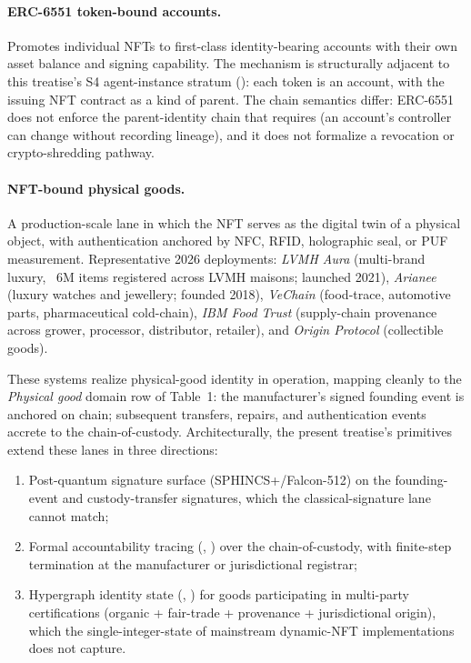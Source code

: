 \documentclass[11pt,a4paper,parskip=half-,DIV=12,headings=standardclasses]{scrartcl}
\theoremstyle{ncthm}
\theoremstyle{ncdef}
\begin{document}
\paragraph{ERC-6551 token-bound accounts.} \cite{erc-6551} Promotes
individual NFTs to first-class identity-bearing accounts with their
own asset balance and signing capability. The mechanism is
structurally adjacent to this treatise's S4 agent-instance stratum
(): each token is an account, with the
issuing NFT contract as a kind of parent. The chain semantics differ:
ERC-6551 does not enforce the parent-identity chain that
 requires (an account's controller
can change without recording lineage), and it does not formalize a
revocation or crypto-shredding pathway.

\paragraph{NFT-bound physical goods.} A production-scale lane in which
the NFT serves as the digital twin of a physical object, with
authentication anchored by NFC, RFID, holographic seal, or PUF
measurement. Representative 2026 deployments:
\emph{LVMH Aura} (multi-brand luxury, ~6M items registered across LVMH
maisons; launched 2021),
\emph{Arianee} (luxury watches and jewellery; founded 2018),
\emph{VeChain} (food-trace, automotive parts, pharmaceutical
cold-chain),
\emph{IBM Food Trust} (supply-chain provenance across grower,
processor, distributor, retailer), and
\emph{Origin Protocol} (collectible goods).

These systems realize physical-good identity in operation, mapping
cleanly to the \emph{Physical good} domain row of Table~1: the
manufacturer's signed founding event is anchored on chain; subsequent
transfers, repairs, and authentication events accrete to the
chain-of-custody. Architecturally, the present treatise's primitives
extend these lanes in three directions:
\begin{enumerate}
\item Post-quantum signature surface (SPHINCS+/Falcon-512) on the
  founding-event and custody-transfer signatures, which the
  classical-signature lane cannot match;
\item Formal accountability tracing (,
  ) over the chain-of-custody, with
  finite-step termination at the manufacturer or jurisdictional
  registrar;
\item Hypergraph identity state (,
  ) for goods participating in multi-party
  certifications (organic + fair-trade + provenance + jurisdictional
  origin), which the single-integer-state of mainstream dynamic-NFT
  implementations does not capture.
\end{enumerate}
\end{document}
